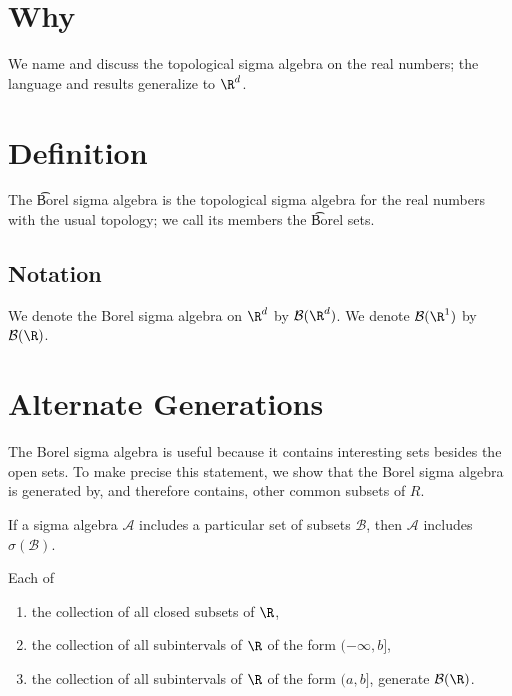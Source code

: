 
\section*{Why}

We name and discuss the topological sigma algebra on the real numbers; the language and results generalize to $\R ^d$.

\section*{Definition}

The \t{Borel sigma algebra} is the topological sigma algebra for the real numbers with the usual topology; we call its members the \t{Borel sets}.

\subsection*{Notation}

We denote the Borel sigma algebra on $\R ^d$ by $\mathcal{B} (\R ^d)$.
We denote $\mathcal{B} (\R ^1)$ by $\mathcal{B} (\R )$.

\section*{Alternate Generations}

The Borel sigma algebra is useful because it contains interesting sets besides the open sets.
To make precise this statement, we show that the Borel sigma algebra is generated by, and therefore contains, other common subsets of $R$.

\begin{proposition}
If a sigma algebra $\mathcal{A} $ includes a particular set of subsets $\mathcal{B} $, then $\mathcal{A} $ includes $\sigma (\mathcal{B} )$.
\end{proposition}

\begin{proposition}

\label{borelalternategenerations}Each of
  \begin{enumerate}
    \item the collection of all closed subsets of $\R$,
    \item the collection of all subintervals of $\R$ of the form $(-\infty, b]$,
    \item the collection of all subintervals of $\R$ of the form $(a, b]$,
generate $\mathcal{B} (\R)$.
  \end{enumerate}
\end{proposition}

